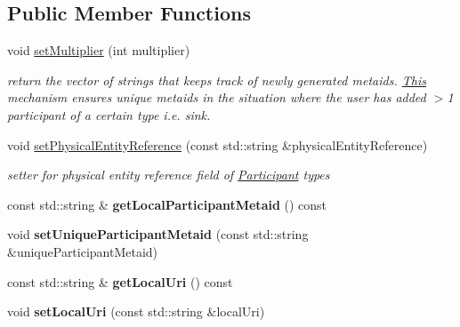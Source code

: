 \subsection*{Public Member Functions}
\begin{DoxyCompactItemize}
\item 
void \hyperlink{classomexmeta_1_1Participant_a97c047d67dc86db1e617c3528bf8035e}{set\+Multiplier} (int multiplier)
\begin{DoxyCompactList}\small\item\em return the vector of strings that keeps track of newly generated metaids. \hyperlink{classThis}{This} mechanism ensures unique metaids in the situation where the user has added $>$1 participant of a certain type i.\+e. sink. \end{DoxyCompactList}\item 
void \hyperlink{classomexmeta_1_1Participant_a415c1205762dff6943426d830d74edcd}{set\+Physical\+Entity\+Reference} (const std\+::string \&physical\+Entity\+Reference)
\begin{DoxyCompactList}\small\item\em setter for physical entity reference field of \hyperlink{classomexmeta_1_1Participant}{Participant} types \end{DoxyCompactList}\item 
\mbox{\label{classomexmeta_1_1Participant_a8a6626e17aca48b76465d66928eee78f}} 
const std\+::string \& {\bfseries get\+Local\+Participant\+Metaid} () const
\item 
\mbox{\label{classomexmeta_1_1Participant_a5e8f680950f55230587c0f85498c5047}} 
void {\bfseries set\+Unique\+Participant\+Metaid} (const std\+::string \&unique\+Participant\+Metaid)
\item 
\mbox{\label{classomexmeta_1_1Participant_a6bf4c724ab5212d10f2a89893f369cd1}} 
const std\+::string \& {\bfseries get\+Local\+Uri} () const
\item 
\mbox{\label{classomexmeta_1_1Participant_a595323ae0681f42a7ba5981e2ee840f1}} 
void {\bfseries set\+Local\+Uri} (const std\+::string \&local\+Uri)
\item 
\mbox{\label{classomexmeta_1_1Participant_a395bc8d2561149a77371ed80e2ed1517}} 

\end{DoxyCompactItemize}
